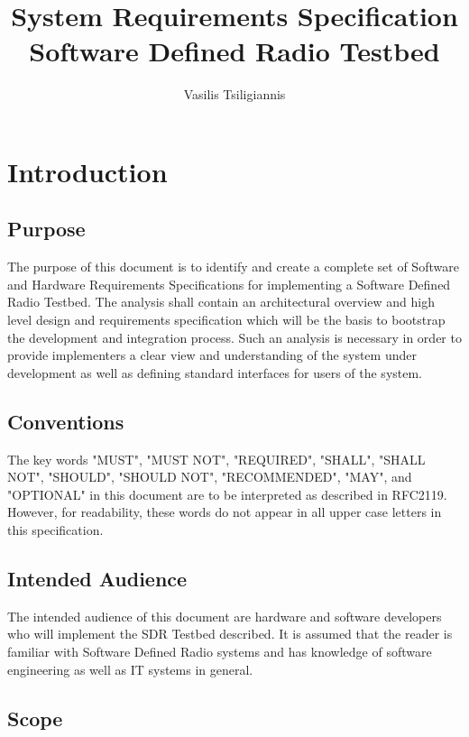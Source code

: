 \documentclass[english,titlepage,a4paper]{report}
\title{
  System Requirements Specification \\
  \large Software Defined Radio Testbed
}
\author{Vasilis Tsiligiannis}
\begin{document}
\renewcommand*{\arraystretch}{2}
\maketitle
\tableofcontents


\chapter{Introduction}
\section{Purpose}

The purpose of this document is to identify and create a complete set of Software and Hardware Requirements Specifications for implementing a Software Defined Radio Testbed.
The analysis shall contain an architectural overview and high level design and requirements specification which will be the basis to bootstrap the development and integration process.
Such an analysis is necessary in order to provide implementers a clear view and understanding of the system under development as well as defining standard interfaces for users of the system.

\section{Conventions}

The key words "MUST", "MUST NOT", "REQUIRED", "SHALL", "SHALL NOT", "SHOULD", "SHOULD NOT", "RECOMMENDED", "MAY", and "OPTIONAL" in this document are to be interpreted as described in RFC2119. However, for readability, these words do not appear in all upper case letters in this specification.

\printglossary[type=definitions,numberedsection,style=definitions,nonumberlist]

\section{Intended Audience}

The intended audience of this document are hardware and software developers who will implement the SDR Testbed described.
It is assumed that the reader is familiar with Software Defined Radio systems and has knowledge of software engineering as well as IT systems in general.

\section{Scope}
\end{document}
